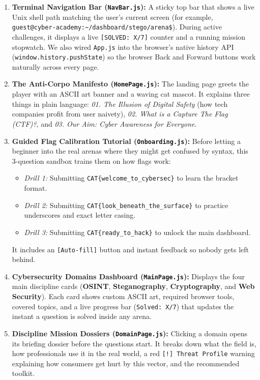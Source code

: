 \documentclass[11pt,a4paper]{article}
\begin{document}
\begin{enumerate}
    \item \textbf{Terminal Navigation Bar (\texttt{NavBar.js}):} A sticky top bar that shows a live Unix shell path matching the user's current screen (for example, \texttt{guest@cyber-academy:\allowbreak\textasciitilde/dashboard/\allowbreak stego/arena\$}). During active challenges, it displays a live \texttt{[SOLVED: X/7]} counter and a running mission stopwatch. We also wired \texttt{App.js} into the browser's native history API (\texttt{window.history.pushState}) so the browser Back and Forward buttons work naturally across every page.
    \item \textbf{The Anti-Corpo Manifesto (\texttt{HomePage.js}):} The landing page greets the player with an ASCII art banner and a waving cat mascot. It explains three things in plain language: \textit{01. The Illusion of Digital Safety} (how tech companies profit from user naivety), \textit{02. What is a Capture The Flag (CTF)?}, and \textit{03. Our Aim: Cyber Awareness for Everyone}.
    \item \textbf{Guided Flag Calibration Tutorial (\texttt{Onboarding.js}):} Before letting a beginner into the real arenas where they might get confused by syntax, this 3-question sandbox trains them on how flags work:
    \begin{itemize}[noitemsep]
        \item \textit{Drill 1:} Submitting \texttt{CAT\{welcome\_to\_cybersec\}} to learn the bracket format.
        \item \textit{Drill 2:} Submitting \texttt{CAT\{look\_beneath\_the\_surface\}} to practice underscores and exact letter casing.
        \item \textit{Drill 3:} Submitting \texttt{CAT\{ready\_to\_hack\}} to unlock the main dashboard.
    \end{itemize}
    It includes an \texttt{[Auto-fill]} button and instant feedback so nobody gets left behind.
    \item \textbf{Cybersecurity Domains Dashboard (\texttt{MainPage.js}):} Displays the four main discipline cards (\textbf{OSINT}, \textbf{Steganography}, \textbf{Cryptography}, and \textbf{Web Security}). Each card shows custom ASCII art, required browser tools, covered topics, and a live progress bar (\texttt{Solved: X/7}) that updates the instant a question is solved inside any arena.
    \item \textbf{Discipline Mission Dossiers (\texttt{DomainPage.js}):} Clicking a domain opens its briefing dossier before the questions start. It breaks down what the field is, how professionals use it in the real world, a red \texttt{[!] Threat Profile} warning explaining how consumers get hurt by this vector, and the recommended toolkit.

\end{enumerate}
\end{document}
